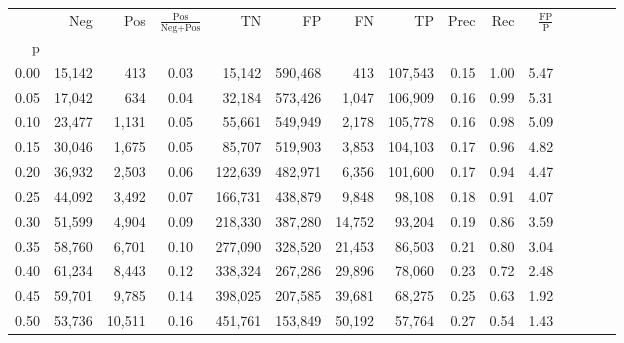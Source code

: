 \begin{tabular}{rrrcrrrrrrrrrrr}
\toprule
{} &     Neg &     Pos & $\frac{\text{Pos}}{\text{Neg}+\text{Pos}}$ &       TN &       FP &       FN &       TP &  Prec &   Rec & $\frac{\text{FP}}{\text{P}}$ \\
p    &         &         &                                            &          &          &          &          &       &       &                              \\
\midrule
0.00 &  15,142 &     413 &                                       0.03 &   15,142 &  590,468 &      413 &  107,543 &  0.15 &  1.00 &                         5.47 \\
0.05 &  17,042 &     634 &                                       0.04 &   32,184 &  573,426 &    1,047 &  106,909 &  0.16 &  0.99 &                         5.31 \\
0.10 &  23,477 &   1,131 &                                       0.05 &   55,661 &  549,949 &    2,178 &  105,778 &  0.16 &  0.98 &                         5.09 \\
0.15 &  30,046 &   1,675 &                                       0.05 &   85,707 &  519,903 &    3,853 &  104,103 &  0.17 &  0.96 &                         4.82 \\
0.20 &  36,932 &   2,503 &                                       0.06 &  122,639 &  482,971 &    6,356 &  101,600 &  0.17 &  0.94 &                         4.47 \\
0.25 &  44,092 &   3,492 &                                       0.07 &  166,731 &  438,879 &    9,848 &   98,108 &  0.18 &  0.91 &                         4.07 \\
0.30 &  51,599 &   4,904 &                                       0.09 &  218,330 &  387,280 &   14,752 &   93,204 &  0.19 &  0.86 &                         3.59 \\
0.35 &  58,760 &   6,701 &                                       0.10 &  277,090 &  328,520 &   21,453 &   86,503 &  0.21 &  0.80 &                         3.04 \\
0.40 &  61,234 &   8,443 &                                       0.12 &  338,324 &  267,286 &   29,896 &   78,060 &  0.23 &  0.72 &                         2.48 \\
0.45 &  59,701 &   9,785 &                                       0.14 &  398,025 &  207,585 &   39,681 &   68,275 &  0.25 &  0.63 &                         1.92 \\
0.50 &  53,736 &  10,511 &                                       0.16 &  451,761 &  153,849 &   50,192 &   57,764 &  0.27 &  0.54 &                         1.43 \\

\end{tabular}
